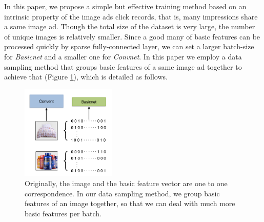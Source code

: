\documentclass{sig-alternate-05-2015}
\begin{document}
In this paper, we propose a simple but effective training method based on an intrinsic property of the image ads click records, that is, many impressions share a same image ad. Though the total size of the dataset is very large, the number of unique images is relatively smaller. Since a good many of basic features can be processed quickly by sparse fully-connected layer, we can set a larger batch-size for \emph{Basicnet} and a smaller one for \emph{Convnet}. In this paper we employ a data sampling method that groups basic features of a same image ad together to achieve that (Figure \ref{fig:sampling}), which is detailed as follows.
\begin{figure}
	\centering
	\includegraphics[width=0.4\textwidth]{sampling}
	\caption{Originally, the image and the basic feature vector are one to one correspondence. In our data sampling method, we group basic features of an image together, so that we can deal with much more basic features per batch. }
	\label{fig:sampling}
\end{figure}
\end{document}
